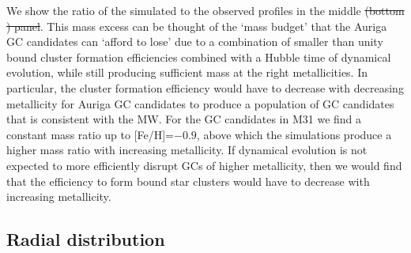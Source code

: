\documentclass[a4paper,fleqn,usenatbib]{mnras}
\providecommand{\DIFadd}[1]{{\protect\color{blue}\uwave{#1}}} %
\providecommand{\DIFdel}[1]{{\protect\color{red}\sout{#1}}}                      %
\providecommand{\DIFaddbegin}{} %
\providecommand{\DIFaddend}{} %
\providecommand{\DIFdelbegin}{} %
\providecommand{\DIFdelend}{} %
\newcommand{\DIFscaledelfig}{0.5}
\newlength{\DIFdelgraphicswidth} %
\newlength{\DIFdelgraphicsheight} %
\newcommand{\DIFaddincludegraphics}[2][]{{\color{blue}\fbox{\DIFOincludegraphics[#1]{#2}}}} %
\newcommand{\DIFdelincludegraphics}[2][]{%
\sbox{\DIFdelgraphicsbox}{\DIFOincludegraphics[#1]{#2}}%
\settoboxwidth{\DIFdelgraphicswidth}{\DIFdelgraphicsbox} %
\settoboxtotalheight{\DIFdelgraphicsheight}{\DIFdelgraphicsbox} %
\scalebox{\DIFscaledelfig}{%
\parbox[b]{\DIFdelgraphicswidth}{\usebox{\DIFdelgraphicsbox}\\[-\baselineskip] \rule{\DIFdelgraphicswidth}{0em}}\llap{\resizebox{\DIFdelgraphicswidth}{\DIFdelgraphicsheight}{%
\setlength{\unitlength}{\DIFdelgraphicswidth}%
\begin{picture}(1,1)%
\thicklines\linethickness{2pt} %
{\color[rgb]{1,0,0}\put(0,0){\framebox(1,1){}}}%
{\color[rgb]{1,0,0}\put(0,0){\line( 1,1){1}}}%
{\color[rgb]{1,0,0}\put(0,1){\line(1,-1){1}}}%
\end{picture}%
}\hspace*{3pt}}} %
} %
\DeclareRobustCommand{\DIFaddbegin}{\DIFOaddbegin \let\includegraphics\DIFaddincludegraphics} %
\DeclareRobustCommand{\DIFaddend}{\DIFOaddend \let\includegraphics\DIFOincludegraphics} %
\DeclareRobustCommand{\DIFdelbegin}{\DIFOdelbegin \let\includegraphics\DIFdelincludegraphics} %
\DeclareRobustCommand{\DIFdelend}{\DIFOaddend \let\includegraphics\DIFOincludegraphics} %
\begin{document}
We show the ratio of the  simulated to the observed profiles in the middle \DIFdelbegin \DIFdel{(bottom
) 
panel}\DIFdelend \DIFaddbegin \DIFadd{and bottom
panels}\DIFaddend . This mass excess can be thought of the `mass budget' that the Auriga GC 
candidates can `afford to lose' due to a combination of smaller than unity bound
cluster formation efficiencies combined with a Hubble time of dynamical evolution,
while still producing sufficient mass at the right metallicities. In particular,
the cluster formation efficiency would have to decrease with decreasing 
metallicity for Auriga GC candidates to produce a population of GC candidates 
that is consistent with the MW. For the GC candidates in M31 we find a constant 
mass ratio up to [Fe/H]=$-0.9$, above which the simulations produce a higher mass ratio 
with increasing metallicity. If dynamical evolution is not expected to more 
efficiently disrupt GCs of higher metallicity, then we would find that the 
efficiency to form bound star clusters would have to decrease with increasing 
metallicity.


\subsection{Radial distribution}
\label{sec:results_Rgc}
\end{document}
